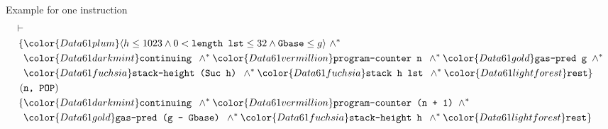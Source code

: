 \documentclass{beamer}
\begin{document}
\begin{frame}{Example for one instruction}
	\begin{align*}
	{\vdash}&\\
	\{&{\color{Data61 plum}\langle h \leq 1023 \wedge 0 < \texttt{length lst} \leq 32 \wedge \texttt{Gbase} \leq g \rangle}~ \wedge^*\\
	&{\color{Data61 dark mint}\texttt{continuing }} \wedge^*
	{\color{Data61 vermillion}\texttt{program-counter n }} \wedge^*
	{\color{Data61 gold}\texttt{gas-pred g }} \wedge^*\\
	&{\color{Data61 fuchsia}\texttt{stack-height (Suc h) }} \wedge^*
	{\color{Data61 fuchsia}\texttt{stack h lst }} \wedge^*
	{\color{Data61 light forest}\texttt{rest}}
	\}\\
	(&\texttt{n, POP}) \\
	\{&{\color{Data61 dark mint}\texttt{continuing }} \wedge^*
	{\color{Data61 vermillion}\texttt{program-counter (n + 1) }} \wedge^*\\
	&{\color{Data61 gold}\texttt{gas-pred (g - Gbase) }} \wedge^*
	{\color{Data61 fuchsia}\texttt{stack-height h }} \wedge^*
	{\color{Data61 light forest}\texttt{rest}}\}
	\end{align*}
\end{frame}
\end{document}
